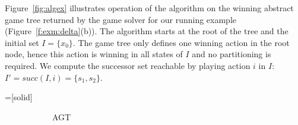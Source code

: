 \begin{example}
Figure~\ref{fig:algex} illustrates operation of the algorithm on the winning abstract game tree returned by the game solver for our running example (Figure~\ref{f:exm:delta}(b)).  The algorithm starts at the root of the tree and the initial set $I=\{x_0\}$.  The game tree only defines one winning action in the root node, hence this action is winning in all states of $I$ and no partitioning is required.  We compute the successor set reachable by playing action $i$ in $I$: $I' = succ(I, i) = \{s_1, s_2\}$.


=[solid]
\begin{figure}
    \centering
    \captionsetup[subfigure]{width=\textwidth,justification=raggedleft}
    \begin{subfigure}[t]{.4\textwidth}
        \centering
        \begin{minipage}[t][4cm][t]{\textwidth}
        \end{minipage}
        \caption{AGT}
        \label{fig:agt}
    \end{subfigure}
    \begin{subfigure}[t]{.4\textwidth}
        \centering
        \begin{minipage}[t][4cm][t]{\textwidth}
        \begin{tikzpicture}[dash pattern = on 2pt off 2pt, level distance = 10mm,baseline]

\end{tikzpicture}
\end{minipage}
\end{subfigure}
\end{figure}
\end{example}
